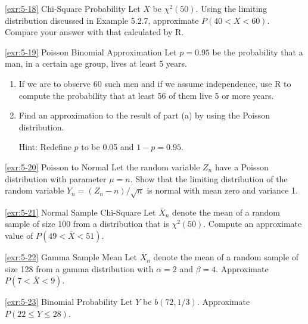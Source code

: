 \begin{exercise}{\ref{exr:5-18} Chi-Square Probability}\label{exr:5-18}
Let $X$ be $\chi^2(50)$. Using the limiting distribution discussed in Example 5.2.7, approximate $P(40 < X < 60)$. Compare your answer with that calculated by R.
\end{exercise}

\begin{exercise}{\ref{exr:5-19} Poisson Binomial Approximation}\label{exr:5-19}
Let $p = 0.95$ be the probability that a man, in a certain age group, lives at least 5 years.
\begin{enumerate}
\item[(a)] If we are to observe 60 such men and if we assume independence, use R to compute the probability that at least 56 of them live 5 or more years.
\item[(b)] Find an approximation to the result of part (a) by using the Poisson distribution.

Hint: Redefine $p$ to be 0.05 and $1-p = 0.95$.
\end{enumerate}
\end{exercise}

\begin{exercise}{\ref{exr:5-20} Poisson to Normal}\label{exr:5-20}
Let the random variable $Z_n$ have a Poisson distribution with parameter $\mu = n$. Show that the limiting distribution of the random variable $Y_n = (Z_n - n)/\sqrt{n}$ is normal with mean zero and variance 1.
\end{exercise}

\begin{exercise}{\ref{exr:5-21} Normal Sample Chi-Square}\label{exr:5-21}
Let $\overline{X}_n$ denote the mean of a random sample of size 100 from a distribution that is $\chi^2(50)$. Compute an approximate value of $P(49 < \overline{X} < 51)$.
\end{exercise}

\begin{exercise}{\ref{exr:5-22} Gamma Sample Mean}\label{exr:5-22}
Let $\overline{X}_n$ denote the mean of a random sample of size 128 from a gamma distribution with $\alpha = 2$ and $\beta = 4$. Approximate $P(7 < \overline{X} < 9)$.
\end{exercise}

\begin{exercise}{\ref{exr:5-23} Binomial Probability}\label{exr:5-23}
Let $Y$ be $b(72, 1/3)$. Approximate $P(22 \leq Y \leq 28)$.
\end{exercise}


